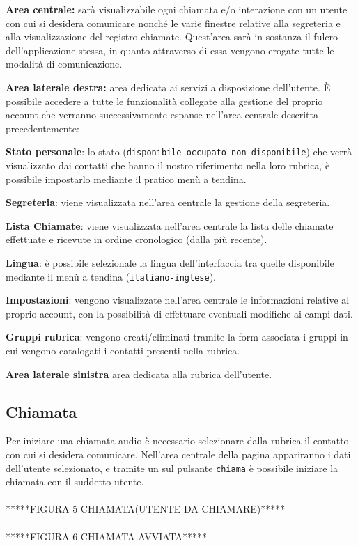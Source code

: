 \begin{description}
\item \textbf{Area centrale:} sarà visualizzabile ogni chiamata e/o interazione con un utente con cui si desidera comunicare nonché le varie finestre relative alla segreteria e alla visualizzazione del registro chiamate. Quest'area sarà in sostanza il fulcro dell'applicazione stessa, in quanto attraverso di essa vengono erogate tutte le modalità di comunicazione.

\item \textbf{Area laterale destra:} area dedicata ai servizi a disposizione dell'utente. È possibile accedere a tutte le funzionalità collegate alla gestione del proprio account che verranno successivamente espanse nell'area centrale descritta precedentemente:
\begin{description}
\item \textbf{Stato personale}: lo stato (\texttt{disponibile-occupato-non disponibile}) che verrà visualizzato dai contatti che hanno il nostro riferimento nella loro rubrica, è possibile impostarlo mediante il pratico menù a tendina.
\item \textbf{Segreteria}: viene visualizzata nell'area centrale la gestione della segreteria.
\item \textbf{Lista Chiamate}: viene visualizzata nell'area centrale la lista delle chiamate effettuate e ricevute in ordine cronologico (dalla più recente).
\item \textbf{Lingua}: è possibile selezionale la lingua dell'interfaccia tra quelle disponibile mediante il menù a tendina (\texttt{italiano-inglese}).
\item \textbf{Impostazioni}: vengono visualizzate nell'area centrale le informazioni relative al proprio account, con la possibilità di effettuare eventuali modifiche ai campi dati.
\item \textbf{Gruppi rubrica}: vengono creati/eliminati tramite la form associata i gruppi in cui vengono catalogati i contatti presenti nella rubrica.
\end{description}
\item \textbf{Area laterale sinistra} area dedicata alla rubrica dell'utente.  
\end{description}

\subsection{Chiamata}
Per iniziare una chiamata audio è necessario selezionare dalla rubrica il contatto con cui si desidera comunicare. Nell'area centrale della pagina appariranno i dati dell'utente selezionato, e tramite un  sul pulsante \texttt{chiama} è possibile iniziare la chiamata con il suddetto utente.
\\\\*****FIGURA 5 CHIAMATA(UTENTE DA CHIAMARE)*****
\\\\*****FIGURA 6 CHIAMATA AVVIATA*****
